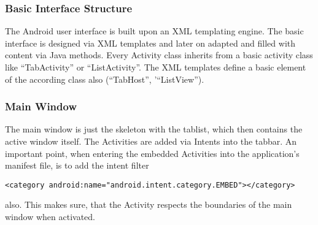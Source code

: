 \subsubsection{Basic Interface Structure} %
\label{ssub:Basic Interface Structure}
The Android user interface is built upon an XML templating engine.
The basic interface is designed via XML templates and later on adapted
and filled with content via Java methods. Every Activity class inherits
from a basic activity class like ``TabActivity'' or ``ListActivity''.
The XML templates define a basic element of the according class also
(``TabHost'', '``ListView'').


\subsubsection{Main Window} %
\label{ssub:MainWindow}

The main window is just the skeleton with the tablist, which then
contains the active window itself. The Activities are added
via Intents into the tabbar. An important point, when entering the embedded
Activities into the application's manifest file, is to add the intent filter
\begin{verbatim}
<category android:name="android.intent.category.EMBED"></category>
\end{verbatim}
also. This makes sure, that the Activity respects the boundaries of the
main window when activated.


